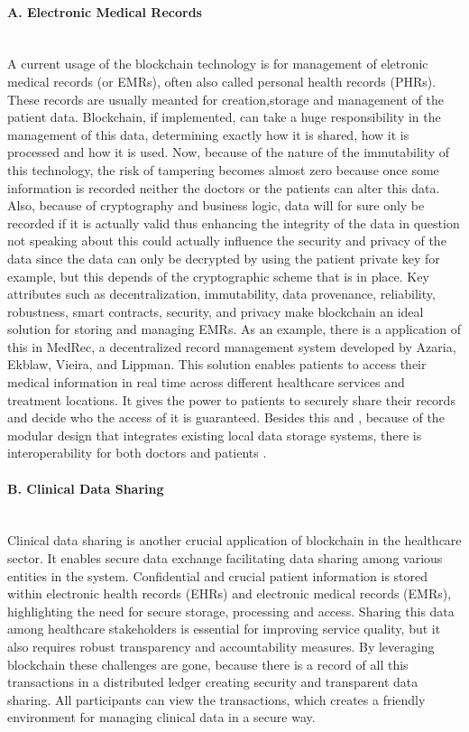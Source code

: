 \paragraph{A. Electronic Medical Records} \mbox{}\\
A current usage of the blockchain technology is for management of eletronic medical records (or EMRs), often also called personal 
health records (PHRs). These records are usually meanted for creation,storage and management of the patient data. Blockchain, if 
implemented, can take a huge responsibility in the management of this data, determining exactly how it is shared, how it is processed
and how it is used. Now, because of the nature of the immutability of this technology, the risk of tampering becomes almost zero because 
once some information is recorded neither the doctors or the patients can alter this data. Also, because of cryptography and business logic, 
data will for sure only be recorded if it is actually valid thus enhancing the integrity of the data in question not speaking about this 
could actually influence the security and privacy of the data since the data can only be decrypted by using the patient private key for 
example, but this depends of the cryptographic scheme that is in place. Key attributes such as decentralization, immutability, data provenance, 
reliability, robustness, smart contracts, security, and privacy make blockchain an ideal solution for storing and managing EMRs. As an
example, there is a application of this in MedRec, a decentralized record management system developed by Azaria, Ekblaw, Vieira, and 
Lippman. This solution enables patients to access their medical information in real time across different healthcare services and treatment 
locations. It gives the power to patients to securely share their records and decide who the access of it is guaranteed. Besides this and ,
because of the modular design that integrates existing local data storage systems, there is interoperability for both doctors and 
patients \cite{apps-block-healthcare}.

\paragraph{B. Clinical Data Sharing} \mbox{}\\
Clinical data sharing is another crucial application of blockchain in the healthcare sector. It enables secure data exchange 
facilitating data sharing among various entities in the system. Confidential and crucial patient information is stored within 
electronic health records (EHRs) and electronic medical records (EMRs), highlighting the need for secure storage, processing and 
access. Sharing this data among healthcare stakeholders is essential for improving service quality, but it also requires robust 
transparency and accountability measures.
By leveraging blockchain these challenges are gone, because there is a record of all this transactions in a distributed ledger 
creating security and transparent data sharing. All participants can view the transactions, which creates a friendly environment 
for managing clinical data in a secure way.

